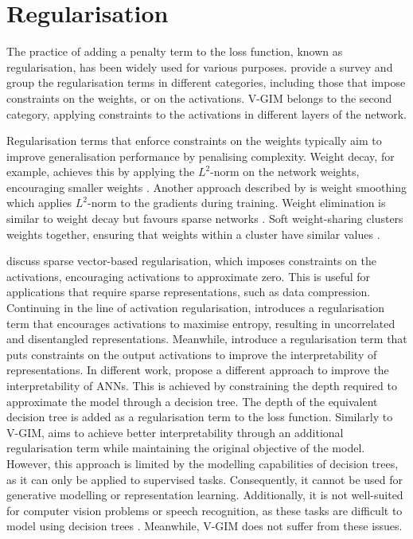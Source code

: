 	
	

\section{Regularisation}
	The practice of adding a penalty term to the loss function, known as regularisation, has been widely used for various purposes. \cite{kukackaRegularizationDeepLearning2017} provide a survey and group the regularisation terms in different categories, including those that impose constraints on the weights, or on the activations. V-GIM belongs to the second category, applying constraints to the activations in different layers of the network.
	
	Regularisation terms that enforce constraints on the weights typically aim to improve generalisation performance by penalising complexity. Weight decay, for example, achieves this by applying the $L^2$-norm on the network weights, encouraging smaller weights \citep{gneccoWeightdecayTechniqueLearning2009}. Another approach described by \cite{kukackaRegularizationDeepLearning2017} is weight smoothing which applies $L^2$-norm to the gradients during training. Weight elimination is similar to weight decay but favours sparse networks \citep{weigendGeneralizationWeightEliminationApplication1990}. Soft weight-sharing clusters weights together, ensuring that weights within a cluster have similar values \citep{nowlanSimplifyingNeuralNetworks1992}.
	
	\cite{tianComprehensiveSurveyRegularization2022} discuss sparse vector-based regularisation, which imposes constraints on the activations, encouraging activations to approximate zero. This is useful for applications that require sparse representations, such as data compression. Continuing in the line of activation regularisation, \cite{tomczakLearningInformativeFeatures2016} introduces a regularisation term that encourages activations to maximise entropy, resulting in uncorrelated and disentangled representations. Meanwhile, \cite{wuImprovingInterpretabilityRegularization2018} introduce a regularisation term that puts constraints on the output activations to improve the interpretability of representations. In different work, \cite{wuOptimizingInterpretabilityDeep2021} propose a different approach to improve the interpretability of ANNs. This is achieved by constraining the depth required to approximate the model through a decision tree. The depth of the equivalent decision tree is added as a regularisation term to the loss function. Similarly to V-GIM, \citeauthor{wuOptimizingInterpretabilityDeep2021} aims to achieve better interpretability through an additional regularisation term while maintaining the original objective of the model. However, this approach is limited by the modelling capabilities of decision trees, as it can only be applied to supervised tasks. Consequently, it cannot be used for generative modelling or representation learning. Additionally, it is not well-suited for computer vision problems or speech recognition, as these tasks are difficult to model using decision trees \citep{stanfordmedaiMedAI34Optimizing2022}. Meanwhile, V-GIM does not suffer from these issues.
	
